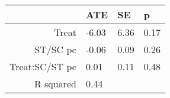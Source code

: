 \begin{tabular}{rlll}
  \hline
 & ATE & SE & p \\ 
  \hline
Treat & -6.03 & 6.36 & 0.17 \\ 
  ST/SC pc & -0.06 & 0.09 & 0.26 \\ 
  Treat:SC/ST pc & 0.01 & 0.11 & 0.48 \\ 
  R squared & 0.44 &  &  \\ 
   \hline
\end{tabular}

